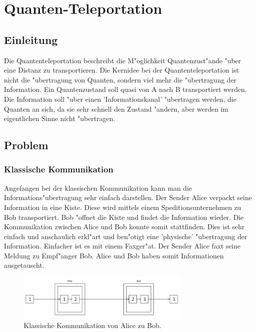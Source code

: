 \chapter{Quanten-Teleportation\label{chapter:teleport}}
\begin{refsection}

\section{Einleitung}
Die Quantenteleportation beschreibt die M"oglichkeit Quantenzust"ande "uber eine Distanz zu transportieren. Die Kernidee bei der Quantenteleportation ist nicht die "ubertragung von Quanten, sondern viel mehr die "ubertragung der Information. Ein Quantenzustand soll quasi von A nach B transportiert werden. Die Information soll "uber einen 'Informationskanal' "ubertragen werden, die Quanten an sich, da sie sehr schnell den Zustand "andern, aber werden im eigentlichen Sinne nicht "ubertragen.

\section{Problem}
\subsection{Klassische Kommunikation}
Angefangen bei der klassischen Kommunikation kann man die Informations"ubertragung sehr einfach darstellen. Der Sender Alice verpackt seine Information in eine Kiste. Diese wird mittels einem Speditionsunternehmen zu Bob transportiert. Bob "offnet die Kiste und findet die Information wieder. Die Kommunikation zwischen Alice und Bob konnte somit stattfinden. Dies ist sehr einfach und anschaulich erkl"art und ben"otigt eine 'physische' "ubertragung der Information. Einfacher ist es mit einem Faxger"at. Der Sender Alice faxt seine Meldung zu Empf"anger Bob. Alice und Bob haben somit Informationen ausgetauscht.
\begin{figure}
\center
\includegraphics[width=0.75\textwidth]{teleport/image/classic_communication.png}
\caption{Klassische Kommunikation von Alice zu Bob.}
\label{Klassische Kommunikation}
\end{figure}

\end{refsection}
